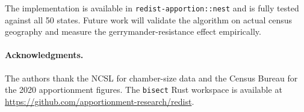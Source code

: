 The implementation is available in \texttt{redist-apportion::nest} and is fully
tested against all 50 states.  Future work will validate the algorithm on actual
census geography and measure the gerrymander-resistance effect empirically.

\paragraph{Acknowledgments.}
The authors thank the NCSL for chamber-size data and the Census Bureau for the
2020 apportionment figures.  The \texttt{bisect} Rust workspace is available
at \url{https://github.com/apportionment-research/redist}.
